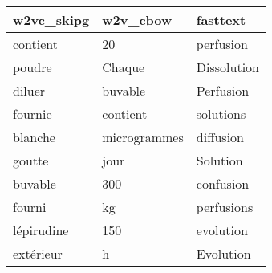 \begin{tabular}{lll}
\toprule
 w2vc\_skipg &      w2v\_cbow &     fasttext \\
\midrule
   contient &            20 &    perfusion \\
     poudre &        Chaque &  Dissolution \\
     diluer &       buvable &    Perfusion \\
    fournie &      contient &    solutions \\
    blanche &  microgrammes &    diffusion \\
     goutte &          jour &     Solution \\
    buvable &           300 &    confusion \\
     fourni &            kg &   perfusions \\
 lépirudine &           150 &    evolution \\
  extérieur &             h &    Evolution \\
\bottomrule
\end{tabular}

